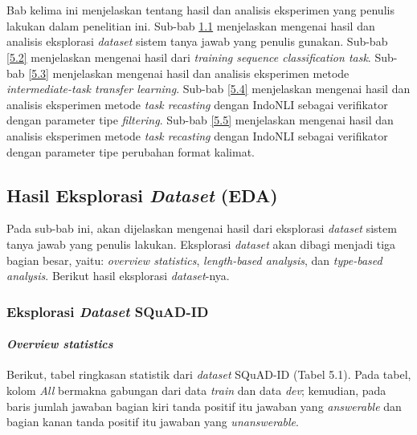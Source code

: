 \chapter{\babLima}
\label{bab:5}
Bab kelima ini menjelaskan tentang hasil dan analisis eksperimen yang penulis lakukan dalam penelitian ini. Sub-bab \ref{5.1} menjelaskan mengenai hasil dan analisis eksplorasi \emph{dataset} sistem tanya jawab yang penulis gunakan. Sub-bab \ref{5.2} menjelaskan mengenai hasil dari \emph{training sequence classification task}. Sub-bab \ref{5.3} menjelaskan mengenai hasil dan analisis eksperimen metode \emph{intermediate-task transfer learning}. Sub-bab \ref{5.4} menjelaskan mengenai hasil dan analisis eksperimen metode \emph{task recasting} dengan IndoNLI sebagai verifikator dengan parameter tipe \emph{filtering}. Sub-bab \ref{5.5} menjelaskan mengenai hasil dan analisis eksperimen metode \emph{task recasting} dengan IndoNLI sebagai verifikator dengan parameter tipe perubahan format kalimat.

\section{Hasil Eksplorasi \emph{Dataset} (EDA)}
\label{5.1}
Pada sub-bab ini, akan dijelaskan mengenai hasil dari eksplorasi \emph{dataset} sistem tanya jawab yang penulis lakukan. Eksplorasi \emph{dataset} akan dibagi menjadi tiga bagian besar, yaitu: \emph{overview statistics}, \emph{length-based analysis}, dan \emph{type-based analysis}. Berikut hasil eksplorasi \emph{dataset}-nya.

\subsection{Eksplorasi \emph{Dataset} SQuAD-ID}

\subsubsection{\emph{Overview statistics}}
Berikut, tabel ringkasan statistik dari \emph{dataset} SQuAD-ID (Tabel 5.1). Pada tabel, kolom \emph{All} bermakna gabungan dari data \emph{train} dan data \emph{dev}; kemudian, pada baris jumlah jawaban bagian kiri tanda positif itu jawaban yang \emph{answerable} dan bagian kanan tanda positif itu jawaban yang \emph{unanswerable}.

